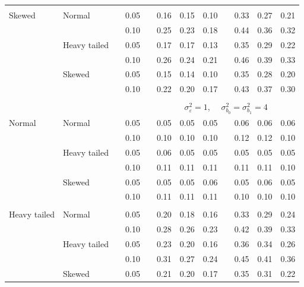 \documentclass[12pt]{article} %
\begin{document}
\begin{table}[ht]
\begin{scriptsize}
\begin{center}
\begin{tabular}{ll p{.1cm} c p{.1cm} rrr p{.1cm} rrr}
             &&&&&&&&&&&\\
Skewed       & Normal       && 0.05 &&   0.16 & 0.15 & 0.10 && 0.33 & 0.27 & 0.21 \\ 
             &              && 0.10 &&   0.25 & 0.23 & 0.18 && 0.44 & 0.36 & 0.32 \\ 
             & Heavy tailed && 0.05 &&   0.17 & 0.17 & 0.13 && 0.35 & 0.29 & 0.22 \\ 
             &              && 0.10 &&   0.26 & 0.24 & 0.21 && 0.46 & 0.39 & 0.33 \\ 
             & Skewed       && 0.05 &&   0.15 & 0.14 & 0.10 && 0.35 & 0.28 & 0.20 \\ 
             &              && 0.10 &&   0.22 & 0.20 & 0.17 && 0.43 & 0.37 & 0.30 \\ 


&&&&&&&&&&&\\
& && && \multicolumn{7}{c}{$\sigma_{\varepsilon}^2 = 1$, \ \ $\sigma_{b_0}^2 = \sigma_{b_1}^2 = 4$} \\ \cline{6-12}
\rowcolor{gray!20}Normal       & Normal       && 0.05 &&  0.05 & 0.05 & 0.05 && 0.06 & 0.06 & 0.06 \\ 
\rowcolor{gray!20}             &              && 0.10 &&  0.10 & 0.10 & 0.10 && 0.12 & 0.12 & 0.10 \\ 
\rowcolor{gray!20}             & Heavy tailed && 0.05 &&  0.06 & 0.05 & 0.05 && 0.05 & 0.05 & 0.05 \\ 
\rowcolor{gray!20}             &              && 0.10 &&  0.11 & 0.11 & 0.11 && 0.11 & 0.11 & 0.10 \\ 
\rowcolor{gray!20}             & Skewed       && 0.05 &&  0.05 & 0.05 & 0.06 && 0.05 & 0.06 & 0.05 \\ 
\rowcolor{gray!20}             &              && 0.10 &&  0.11 & 0.11 & 0.11 && 0.10 & 0.10 & 0.10 \\ 
             &&&&&&&&&&&\\
Heavy tailed & Normal       && 0.05 &&  0.20 & 0.18 & 0.16 && 0.33 & 0.29 & 0.24 \\ 
             &              && 0.10 &&  0.28 & 0.26 & 0.23 && 0.42 & 0.39 & 0.33 \\ 
             & Heavy tailed && 0.05 &&  0.23 & 0.20 & 0.16 && 0.36 & 0.34 & 0.26 \\ 
             &              && 0.10 &&  0.31 & 0.27 & 0.24 && 0.45 & 0.41 & 0.36 \\ 
             & Skewed       && 0.05 &&  0.21 & 0.20 & 0.17 && 0.35 & 0.31 & 0.22 \\ 

\end{tabular}
\end{center}
\end{scriptsize}
\end{table}
\end{document}
